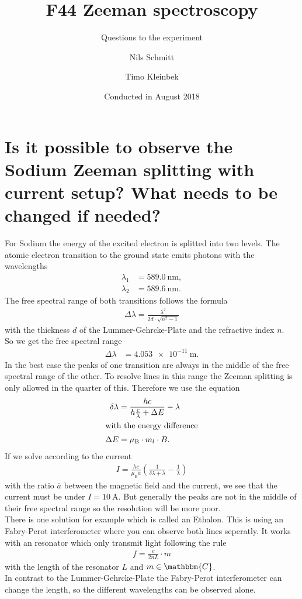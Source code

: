 \documentclass[12pt,
				 a4paper,
				 ]{scrartcl}
\title{F44 Zeeman spectroscopy}
\subtitle{Questions to the experiment}
\author{Nils Schmitt \and Timo Kleinbek}
\date{Conducted in August 2018}
\begin{document}
\maketitle

\section*{Is it possible to observe the Sodium Zeeman splitting with current setup?
What needs to be changed if needed?}
For Sodium the energy of the excited electron is splitted into two levels.
The atomic electron transition to the ground state emits photons with the wavelengths
\begin{align*}
\lambda_1&=\SI{589.0}{\nano\meter},\\
\lambda_2&=\SI{589.6}{\nano\meter}.
\end{align*}
The free spectral range of both transitions follows the formula
\begin{align}
\Delta\lambda=\frac{\lambda^2}{2d\cdot\sqrt{n^2-1}}
\end{align}
with the thickness $d$ of the Lummer-Gehrcke-Plate and the refractive index $n$.\\
So we get the free spectral range
\begin{align*}
\Delta\lambda&=\SI{4.053e-11}{\meter}.
\end{align*}
In the best case the peaks of one transition are always in the middle of the free spectral range of the other.
To resolve lines in this range the Zeeman splitting is only allowed in the quarter of this.
Therefore we use the equation
\begin{align}
\delta\lambda&=\frac{hc}{h\frac{c}{\lambda}+\Delta E}-\lambda\\
\intertext{with the energy difference}
\Delta E&=\mu_\text{B}\cdot m_l\cdot B.
\end{align}
If we solve according to the current
\begin{align}
I=\frac{hc}{\mu_\text{B}\overline{a}}\left(\frac{1}{\delta\lambda+\lambda}-\frac{1}{\lambda}\right)
\end{align}
with the ratio $\overline{a}$ between the magnetic field and the current, we see that the current must be under $I=\SI{10}{\ampere}$.
But generally the peaks are not in the middle of their free spectral range so the resolution will be more poor.\\
There is one solution for example which is called an Ethalon.
This is using an Fabry-Perot interferometer where you can observe both lines seperatly.
It works with an resonator which only transmit light following the rule
\begin{align}
f=\frac{c}{2nL}\cdot m
\end{align}
with the length of the resonator $L$ and $m\in\mathbbm{C}$.\\
In contrast to the Lummer-Gehrcke-Plate the Fabry-Perot interferometer can change the length, so the different wavelengths can be observed alone.
\end{document}
